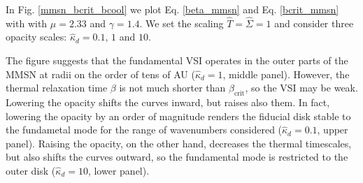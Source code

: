 In Fig. \ref{mmsn_bcrit_bcool} we plot Eq. \ref{beta_mmsn} and
Eq. \ref{bcrit_mmsn} with with $\mu =2.33$ and $\gamma=1.4$.  We set
the scaling $\hat{T}=\hat{\Sigma}=1$ and consider three opacity scales:
$\hat{\kappa}_d=0.1, \,1 $ and $10$. 

The figure suggests that the fundamental VSI 
operates in the outer parts of the MMSN at radii on 
the order of tens of AU ($\hat{\kappa}_d=1$, middle panel). 
However, the thermal relaxation time $\beta$
is not much shorter than $\beta_\mathrm{crit}$, so the VSI may be 
weak. Lowering the opacity shifts the curves
inward, but raises also them. In fact, lowering the opacity by an
order of magnitude renders the fiducial  disk stable to the fundametal
mode for the range of wavenumbers considered ($\hat{\kappa}_d=0.1$,
upper panel). Raising the opacity, on
the other hand, decreases the thermal timescales, but also shifts the
curves outward, so the fundamental mode is restricted to the outer
disk ($\hat{\kappa}_d=10$, lower panel). 


